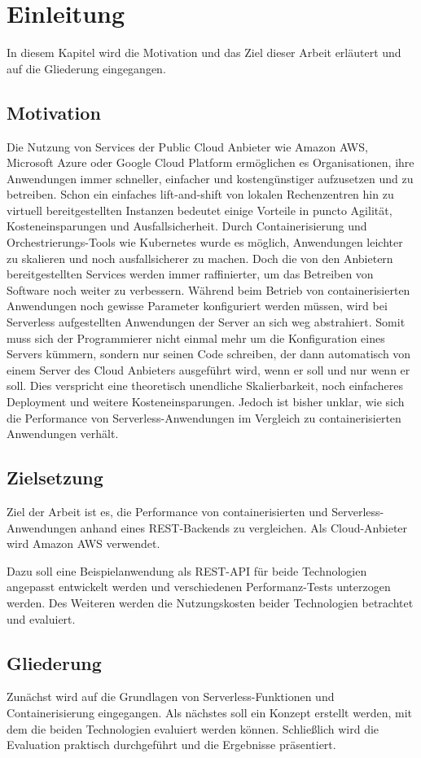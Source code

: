 \chapter{Einleitung}
In diesem Kapitel wird die Motivation und das Ziel dieser Arbeit erläutert und auf die Gliederung eingegangen.

\section{Motivation}
Die Nutzung von Services der Public Cloud Anbieter wie Amazon AWS, Microsoft Azure oder Google Cloud Platform ermöglichen es Organisationen, ihre Anwendungen immer schneller, einfacher und kostengünstiger aufzusetzen und zu betreiben. Schon ein einfaches lift-and-shift von lokalen Rechenzentren hin zu virtuell bereitgestellten Instanzen bedeutet einige Vorteile in puncto Agilität, Kosteneinsparungen und Ausfallsicherheit. Durch Containerisierung und Orchestrierungs-Tools wie Kubernetes wurde es möglich, Anwendungen leichter zu skalieren und noch ausfallsicherer zu machen. Doch die von den Anbietern bereitgestellten Services werden immer raffinierter, um das Betreiben von Software noch weiter zu verbessern. Während beim Betrieb von containerisierten Anwendungen noch gewisse Parameter konfiguriert werden müssen, wird bei Serverless aufgestellten Anwendungen der Server an sich weg abstrahiert. Somit muss sich der Programmierer nicht einmal mehr um die Konfiguration eines Servers kümmern, sondern nur seinen Code schreiben, der dann automatisch von einem Server des Cloud Anbieters ausgeführt wird, wenn er soll und nur wenn er soll. Dies verspricht eine theoretisch unendliche Skalierbarkeit, noch einfacheres Deployment und weitere Kosteneinsparungen. Jedoch ist bisher unklar, wie sich die Performance von Serverless-Anwendungen im Vergleich zu containerisierten Anwendungen verhält. 

\section{Zielsetzung}
Ziel der Arbeit ist es, die Performance von containerisierten und Serverless-Anwendungen anhand eines REST-Backends zu vergleichen. Als Cloud-Anbieter wird Amazon AWS verwendet.

Dazu soll eine Beispielanwendung als REST-API für beide Technologien angepasst entwickelt werden und verschiedenen Performanz-Tests unterzogen werden. Des Weiteren werden die Nutzungskosten beider Technologien betrachtet und evaluiert.

\section{Gliederung}
Zunächst wird auf die Grundlagen von Serverless-Funktionen und Containerisierung eingegangen. Als nächstes soll ein Konzept erstellt werden, mit dem die beiden Technologien evaluiert werden können. Schließlich wird die Evaluation praktisch durchgeführt und die Ergebnisse präsentiert.